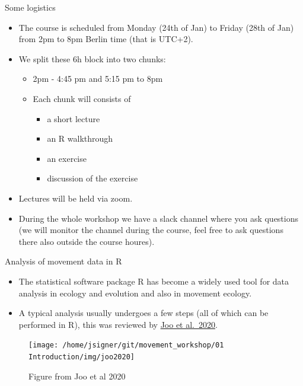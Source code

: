 \documentclass[ignorenonframetext,,t]{beamer}
\providecommand{\tightlist}{%
\setlength{\itemsep}{0pt}\setlength{\parskip}{0pt}}
\providecommand{\tightlist}{%
\setlength{\itemsep}{0pt}\setlength{\parskip}{0pt}}
\renewcommand{\tightlist}{\setlength{\itemsep}{1.4ex}\setlength{\parskip}{0pt}}
\begin{document}
\begin{frame}
\begin{block}{Some logistics}
\protect\hypertarget{some-logistics}{}
\begin{itemize}
\item
  The course is scheduled from Monday (24th of Jan) to Friday (28th of
  Jan) from 2pm to 8pm Berlin time (that is UTC+2).
\item
  We split these 6h block into two chunks:

  \begin{itemize}
  \tightlist
  \item
    2pm - 4:45 pm and 5:15 pm to 8pm
  \item
    Each chunk will consists of

    \begin{itemize}
    \tightlist
    \item
      a short lecture
    \item
      an R walkthrough
    \item
      an exercise
    \item
      discussion of the exercise
    \end{itemize}
  \end{itemize}
\item
  Lectures will be held via zoom.
\item
  During the whole workshop we have a slack channel where you ask
  questions (we will monitor the channel during the course, feel free to
  ask questions there also outside the course houres).
\end{itemize}
\end{block}
\end{frame}

\begin{frame}{Analysis of movement data in R}
\protect\hypertarget{analysis-of-movement-data-in-r}{}
\begin{itemize}
\item
  The statistical software package R has become a widely used tool for
  data analysis in ecology and evolution and also in movement ecology.
\item
  A typical analysis usually undergoes a few steps (all of which can be
  performed in R), this was reviewed by
  \href{https://besjournals.onlinelibrary.wiley.com/doi/full/10.1111/1365-2656.13116}{Joo
  et al.~2020}.
\end{itemize}

\begin{figure}

{\centering \texttt{[image: /home/jsigner/git/movement\_workshop/01 Introduction/img/joo2020]} 

}

\caption{Figure from Joo et al 2020}\label{fig:unnamed-chunk-1}
\end{figure}
\end{frame}
\end{document}
